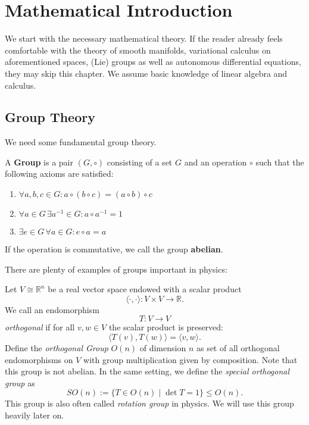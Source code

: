 \chapter{Mathematical Introduction}
\label{chap:matint}
\vspace*{-0.9cm}


We start with the necessary mathematical theory. If the reader already feels comfortable with the theory of smooth manifolds, variational calculus on aforementioned spaces, (Lie) groups as well as autonomous differential equations, they may skip this chapter. We assume basic knowledge of linear algebra and calculus.

\section{Group Theory}
We need some fundamental group theory.
\begin{definition}[Group]
A \textbf{Group} is a pair $(G, \circ)$ consisting of a set $G$ and an operation $\circ$ such that the following axioms are satisfied:
\begin{enumerate}[({G}1)]
    \item $\forall a,b,c \in G: a \circ (b \circ c) = (a \circ b) \circ c$
    \item $\forall a \in G \, \exists a^{-1} \in G: a \circ a^{-1} = 1$
    \item $\exists e \in G \, \forall a \in G: e \circ a = a$
\end{enumerate}
If the operation is commutative, we call the group \textbf{abelian}.
\end{definition}
There are plenty of examples of groups important in physics:
\begin{eg}
Let $V \cong \mathbb{R}^n$ be a real vector space endowed with a scalar product \[\langle \cdot, \cdot \rangle: V \times V \to \mathbb{R}.\] We call an endomorphism \[T: V \to V\] \emph{orthogonal} if for all $v,w \in V$ the scalar product is preserved: \[\langle T(v), T(w) \rangle = \langle v,w \rangle.\] Define the \emph{orthogonal Group} $O(n)$ of dimension $n$ as set of all orthogonal endomorphisms on $V$ with group multiplication given by composition. Note that this group is not abelian.
In the same setting, we define the \emph{special orthogonal group} as
            \begin{equation}
                SO(n):=\{T \in O(n) \mid \det T = 1\} \leq O(n).
            \end{equation}
        This group is also often called \emph{rotation group} in physics. We will use this group heavily later on.
\end{eg}



